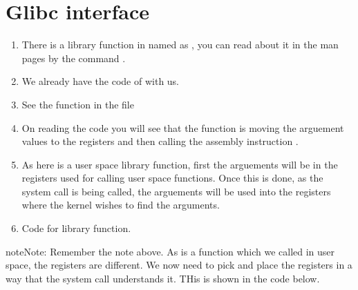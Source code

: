 \documentclass[letterpaper,10pt,english]{sphinxmanual}
\begin{document}
\section{Glibc  interface}
\label{\detokenize{07_calling_system_calls:glibc-syscall-interface}}\begin{enumerate}
\item {} 
There is a library function in  named as , you can read
about it in the man pages by the command .

\item {} 
We already have the code of  with us.

\item {} 
See the function in the file

\item {} 
On reading the code you will see that the function is moving the arguement
values to the registers and then calling the assembly instruction .

\item {} 
As  here is a user space  library function, first the
arguements will be in the registers used for calling user space functions. Once
this is done, as the system call is being called, the arguements will be used
into the registers where the kernel wishes to find the arguments.

\item {} 
Code for  library function.

\end{enumerate}

\begin{sphinxadmonition}{note}{Note:}
Remember the note above. As  is a function which we called
in user space, the registers are different. We now need to pick and place
the registers in a way that the system call understands it. THis is shown in
the code below.
\end{sphinxadmonition}
\end{document}
